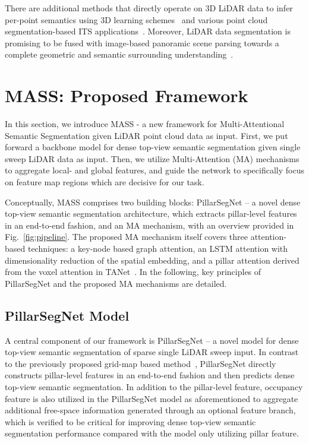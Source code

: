 \documentclass[lettersize,journal]{IEEEtran}
\begin{document}
There are additional methods that directly operate on 3D LiDAR data to infer per-point semantics using 3D learning schemes~\cite{pass3d,randlanet,cylindrical_asymmetrical} and various point cloud segmentation-based ITS applications~\cite{multiscale_pointwise,low_channel_lidar,backpack_lidar,fast_pointcloud_ground}.
Moreover, LiDAR data segmentation is promising to be fused with image-based panoramic scene parsing towards a complete geometric and semantic surrounding understanding~\cite{camera_lidar_integration,ooss,semanticvoxels}.

\section{MASS: Proposed Framework}
In this section, we introduce MASS - a new framework for Multi-Attentional Semantic Segmentation given LiDAR point cloud data as input.
First, we put forward a backbone model for dense top-view semantic segmentation given single sweep LiDAR data as input.
Then, we utilize Multi-Attention (MA) mechanisms to aggregate local- and global features, and guide the network to specifically focus on feature map regions which are decisive for our task.

Conceptually, MASS comprises two building blocks: PillarSegNet -- a novel dense top-view semantic segmentation architecture, which extracts pillar-level features in an end-to-end fashion, and an MA mechanism, with an overview provided in Fig.~\ref{fig:pipeline}.
The proposed MA mechanism itself covers three attention-based techniques: a key-node based graph attention, an LSTM attention with dimensionality reduction of the spatial embedding, and a pillar attention derived from the voxel attention in TANet~\cite{tanet}. 
In the following, key principles of PillarSegNet and the proposed MA mechanisms are detailed.

\subsection{PillarSegNet Model}
A central component of our framework is PillarSegNet -- a novel model for dense top-view semantic segmentation of sparse single LiDAR sweep input.
In contrast to the previously proposed grid-map based method~\cite{bieder2020exploiting}, PillarSegNet directly constructs pillar-level features in an end-to-end fashion and then predicts dense top-view semantic segmentation.
In addition to the pillar-level feature, occupancy feature is also utilized in the PillarSegNet model as aforementioned to aggregate additional free-space information generated through an optional feature branch, which is verified to be critical for improving dense top-view semantic segmentation performance compared with the model only utilizing pillar feature.
\end{document}
